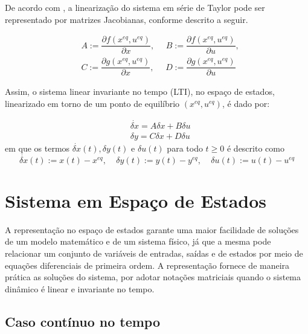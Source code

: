 De acordo com \cite{Hespanha}, a linearização do sistema em série de Taylor pode ser representado por matrizes Jacobianas, conforme descrito a seguir.

\begin{equation}\label{eq:MatrizesLineares}
    \begin{array}{cc}
         &  A := \dfrac{\partial f(x^{eq},u^{eq})}{\partial x}, ~~~~~~ B := \dfrac{\partial f(x^{eq},u^{eq})}{\partial u},\\[15pt]
         & C := \dfrac{\partial g(x^{eq},u^{eq})}{\partial x}, ~~~~~~ D := \dfrac{\partial g(x^{eq},u^{eq})}{\partial u}
    \end{array}{}
\end{equation}{}

Assim, o sistema linear invariante no tempo (LTI), no espaço de estados, linearizado em torno de um ponto de equilíbrio $(x^{eq},u^{eq})$, é dado por:

\begin{equation}
    \begin{array}{cc}
         &  \dot{\delta x} = A\delta x + B\delta u \\[6pt]
         &  \delta y = C\delta x + D\delta u
    \end{array}{}
\end{equation}{}
em que os termos $\dot{\delta x}(t), \delta{y}(t)$ e $\delta u(t)$ para todo $t \ge 0$ é descrito como
\begin{equation}
    \dot{\delta x}(t) := x(t) - x^{eq}, ~~~~~ \delta y(t) := y(t) - y^{eq}, ~~~~~ \delta u(t) := u(t) - u^{eq} 
\end{equation}{}


\section{Sistema em Espaço de Estados}\label{sec:EspacoEstados}

A representação no espaço de estados garante uma maior facilidade de soluções de um modelo matemático e de um sistema físico, já que a mesma pode relacionar um conjunto de variáveis de entradas, saídas e de estados por meio de equações diferenciais de primeira ordem. A representação fornece de maneira prática as soluções do sistema, por adotar notações matriciais quando o sistema dinâmico é linear e invariante no tempo.

\subsection{Caso contínuo no tempo}

